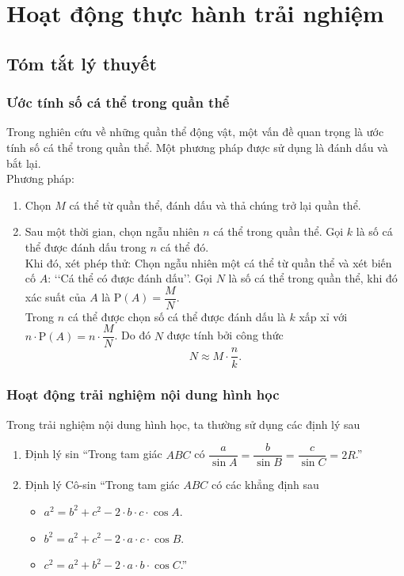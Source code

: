 \section{Hoạt động thực hành trải nghiệm}
\subsection{Tóm tắt lý thuyết}
\subsubsection{Ước tính số cá thể trong quần thể}
Trong nghiên cứu về những quần thể động vật, một vấn đề quan trọng là ước tính số cá thể trong quần thể. Một phương pháp được sử dụng là đánh dấu và bắt lại.\\
Phương pháp: 
\begin{enumerate}
	\item Chọn $M$ cá thể từ quần thể, đánh dấu và thả chúng trở lại quần thể.
	\item Sau một thời gian, chọn ngẫu nhiên $n$ cá thể trong quần thể. Gọi $k$ là số cá thể được đánh dấu trong $n$ cá thể đó.\\
	Khi đó, xét phép thử: Chọn ngẫu nhiên một cá thể từ quần thể và xét biến cố $A$: \lq\lq  Cá thể có được đánh dấu\rq\rq. Gọi $N$ là số cá thể trong quần thể, khi đó xác suất của $A$ là $\mathrm{P}(A)=\dfrac{M}{N}$.\\
	Trong $n$ cá thể được chọn số cá thể được đánh dấu là $k$ xấp xỉ với $n\cdot \mathrm{P}(A)=n\cdot \dfrac{M}{N}$. Do đó $N$ được tính bởi công thức 
	\[N\approx M\cdot \dfrac{n}{k}.\]
\end{enumerate}
\subsubsection{Hoạt động trải nghiệm nội dung hình học}
Trong trải nghiệm nội dung hình học, ta thường sử dụng các định lý sau
\begin{enumerate}
\item Định lý sin ``Trong tam giác $ABC$ có $\dfrac{a}{\sin A}=\dfrac{b}{\sin B}=\dfrac{c}{\sin C}=2R$.''
\item Định lý Cô-sin ``Trong tam giác $ABC$ có các khẳng định sau
\begin{itemize}
\item $a^{2}=b^{2}+c^{2}-2 \cdot b \cdot c \cdot \cos A$.
\item $b^{2}=a^{2}+c^{2}-2 \cdot a \cdot c \cdot \cos B$.
\item $c^{2}=a^{2}+b^{2}-2 \cdot a \cdot b \cdot \cos C$.''
\end{itemize}
\end{enumerate}


